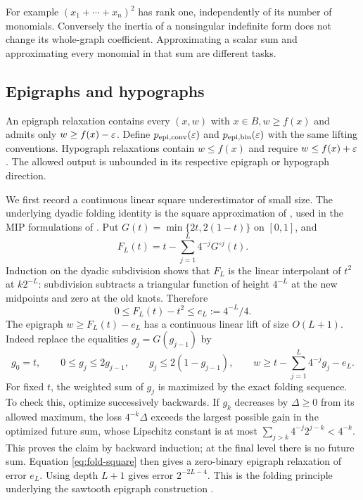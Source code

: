 For example $(x_1+\cdots+x_n)^2$ has rank one, independently of its
number of monomials. Conversely the inertia of a nonsingular indefinite
form does not change its whole-graph coefficient. Approximating a scalar
sum and approximating every monomial in that sum are different tasks.

\subsection{Epigraphs and hypographs}

An epigraph relaxation contains every $(x,w)$ with $x\in B,w\ge f(x)$
and admits only $w\ge f(x)-\varepsilon$. Define
$p_{\mathrm{epi,conv}}(\varepsilon)$ and $p_{\mathrm{epi,bin}}(\varepsilon)$ with the
same lifting conventions. Hypograph relaxations contain $w\le f(x)$
and require $w\le f(x)+\varepsilon$. The allowed output is unbounded in its
respective epigraph or hypograph direction.

We first record a continuous linear square underestimator of small
size. The underlying dyadic folding identity is the square approximation
of \citet[Proposition 2]{yarotsky2017}, used in the MIP formulations of
\citet{beach2022}. Put $G(t)=\min\{2t,2(1-t)\}$ on $[0,1]$, and
\[
 F_L(t)=t-\sum_{j=1}^L4^{-j}G^{\circ j}(t).
\]
Induction on the dyadic subdivision shows that $F_L$ is the linear
interpolant of $t^2$ at $k2^{-L}$: subdivision subtracts a triangular
function of height $4^{-L}$ at the new midpoints and zero at the old
knots. Therefore
\begin{equation}\label{eq:fold-square}
 0\le F_L(t)-t^2\le e_L:=4^{-L}/4.
\end{equation}
The epigraph $w\ge F_L(t)-e_L$ has a continuous linear lift of size
$O(L+1)$. Indeed replace the equalities $g_j=G(g_{j-1})$ by
\[
 g_0=t,\qquad 0\le g_j\le2g_{j-1},\qquad
 g_j\le2(1-g_{j-1}),\qquad
 w\ge t-\sum_{j=1}^L4^{-j}g_j-e_L.
\]
For fixed $t$, the weighted sum of $g_j$ is maximized by the exact
folding sequence. To check this, optimize successively backwards. If
$g_k$ decreases by $\Delta\ge0$ from its allowed maximum, the loss
$4^{-k}\Delta$ exceeds the largest possible gain in the optimized
future sum, whose Lipschitz constant is at most
$\sum_{j>k}4^{-j}2^{j-k}<4^{-k}$. This proves the claim by backward
induction; at the final level there is no future sum. Equation
\eqref{eq:fold-square} then gives a zero-binary epigraph relaxation of
error $e_L$. Using depth $L+1$ gives error $2^{-2L-4}$. This is the
folding principle underlying the sawtooth epigraph construction
\citep{beach2024}.

